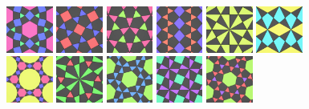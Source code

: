 \documentclass{beamer}
\begin{document}
\begin{frame}
  \includegraphics[width=0.6in]{hh13}
  \hspace{0.1mm}
  \includegraphics[width=0.6in]{hh14}
  \hspace{0.1mm}
  \includegraphics[width=0.6in]{hh15}
  \hspace{0.1mm}
  \includegraphics[width=0.6in]{hh16}
  \hspace{0.1mm}
  \includegraphics[width=0.6in]{hh17}
  \hspace{0.1mm}
  \includegraphics[width=0.6in]{hh18}\\[0.7mm]

  \includegraphics[width=0.6in]{hh19}
  \hspace{0.1mm}
  \includegraphics[width=0.6in]{hh20}
  \hspace{0.1mm}
  \includegraphics[width=0.6in]{hh21}
  \hspace{0.1mm}
  \includegraphics[width=0.6in]{hh22}
  \hspace{0.1mm}
  \includegraphics[width=0.6in]{hh23}


\end{frame}
\end{document}
